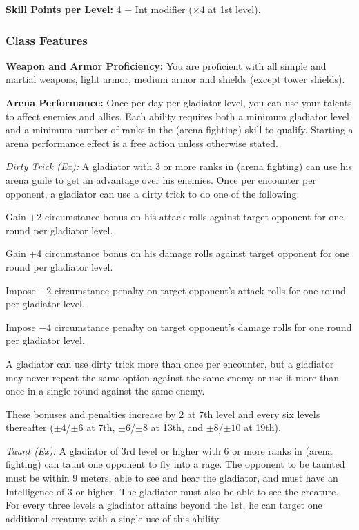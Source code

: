 \textbf{Skill Points per Level:} 4 + Int modifier ($\times4$ at 1st level).

\subsubsection{Class Features}
\textbf{Weapon and Armor Proficiency:} You are proficient with all simple and martial weapons, light armor, medium armor and shields (except tower shields).

\textbf{Arena Performance:} Once per day per gladiator level, you can use your talents to affect enemies and allies. Each ability requires both a minimum gladiator level and a minimum number of ranks in the  (arena fighting) skill to qualify. Starting a arena performance effect is a free action unless otherwise stated.

\textit{Dirty Trick (Ex):} A gladiator with 3 or more ranks in  (arena fighting) can use his arena guile to get an advantage over his enemies. Once per encounter per opponent, a gladiator can use a dirty trick to do one of the following:

\begin{itemize*}
\item Gain +2 circumstance bonus on his attack rolls against target opponent for one round per gladiator level.
\item Gain +4 circumstance bonus on his damage rolls against target opponent for one round per gladiator level.
\item Impose $-2$ circumstance penalty on target opponent's attack rolls for one round per gladiator level.
\item Impose $-4$ circumstance penalty on target opponent's damage rolls for one round per gladiator level.
\end{itemize*}

A gladiator can use dirty trick more than once per encounter, but a gladiator may never repeat the same option against the same enemy or use it more than once in a single round against the same enemy.

These bonuses and penalties increase by 2 at 7th level and every six levels thereafter ($\pm4$/$\pm6$ at 7th, $\pm6$/$\pm8$ at 13th, and $\pm8$/$\pm10$ at 19th).


\textit{Taunt (Ex):} A gladiator of 3rd level or higher with 6 or more ranks in  (arena fighting) can taunt one opponent to fly into a rage. The opponent to be taunted must be within 9 meters, able to see and hear the gladiator, and must have an Intelligence of 3 or higher. The gladiator must also be able to see the creature. For every three levels a gladiator attains beyond the 1st, he can target one additional creature with a single use of this ability.

